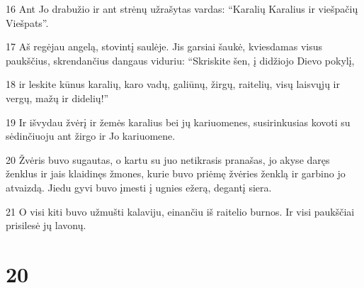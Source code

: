 \par 16 Ant Jo drabužio ir ant strėnų užrašytas vardas: “Karalių Karalius ir viešpačių Viešpats”. 
\par 17 Aš regėjau angelą, stovintį saulėje. Jis garsiai šaukė, kviesdamas visus paukščius, skrendančius dangaus viduriu: “Skriskite šen, į didžiojo Dievo pokylį, 
\par 18 ir leskite kūnus karalių, karo vadų, galiūnų, žirgų, raitelių, visų laisvųjų ir vergų, mažų ir didelių!” 
\par 19 Ir išvydau žvėrį ir žemės karalius bei jų kariuomenes, susirinkusias kovoti su sėdinčiuoju ant žirgo ir Jo kariuomene. 
\par 20 Žvėris buvo sugautas, o kartu su juo netikrasis pranašas, jo akyse daręs ženklus ir jais klaidinęs žmones, kurie buvo priėmę žvėries ženklą ir garbino jo atvaizdą. Jiedu gyvi buvo įmesti į ugnies ežerą, degantį siera. 
\par 21 O visi kiti buvo užmušti kalaviju, einančiu iš raitelio burnos. Ir visi paukščiai prisilesė jų lavonų.


\chapter{20}


